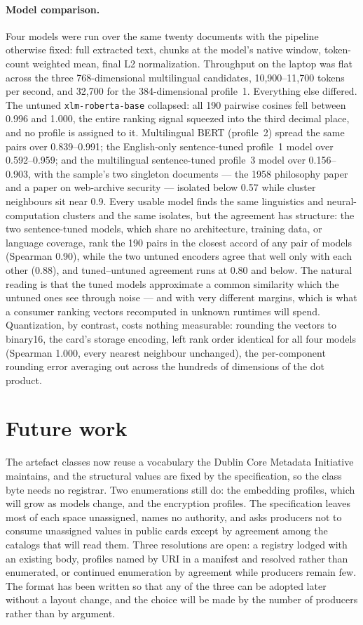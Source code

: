 \documentclass[sigconf]{acmart}
\begin{document}
\paragraph{Model comparison.} Four models were run over the same twenty
documents with the pipeline otherwise fixed: full extracted text, chunks at
the model's native window, token-count weighted mean, final L2
normalization. Throughput on the laptop was flat across the three
768-dimensional multilingual candidates, 10,900--11,700 tokens per second,
and 32,700 for the 384-dimensional profile~1. Everything else differed. The
untuned \texttt{xlm-roberta-base} collapsed: all 190 pairwise cosines fell
between 0.996 and 1.000, the entire ranking signal squeezed into the third
decimal place, and no profile is assigned to it. Multilingual BERT
(profile~2) spread the same pairs over 0.839--0.991; the English-only
sentence-tuned profile~1 model over 0.592--0.959; and the multilingual
sentence-tuned profile~3 model over 0.156--0.903, with the sample's two
singleton documents --- the 1958 philosophy paper and a paper on
web-archive security --- isolated below 0.57 while cluster neighbours sit
near 0.9. Every usable model finds the same linguistics and
neural-computation clusters and the same isolates, but the agreement has
structure: the two sentence-tuned models, which share no architecture,
training data, or language coverage, rank the 190 pairs in the closest
accord of any pair of models (Spearman 0.90), while the two untuned
encoders agree that well only with each other (0.88), and tuned--untuned
agreement runs at 0.80 and below. The natural reading is that the tuned
models approximate a common similarity which the untuned ones see through
noise --- and with very different margins, which is what a consumer ranking
vectors recomputed in unknown runtimes will spend. Quantization, by
contrast, costs nothing measurable: rounding the vectors to binary16, the
card's storage encoding, left rank order identical for all four models
(Spearman 1.000, every nearest neighbour unchanged), the per-component
rounding error averaging out across the hundreds of dimensions of the dot
product.

\section{Future work}
\label{sec:governance}

The artefact classes now reuse a vocabulary the Dublin Core Metadata
Initiative maintains, and the structural values are fixed by the
specification, so the class byte needs no registrar. Two enumerations still
do: the embedding profiles, which will grow as models change, and the
encryption profiles. The specification leaves most of each space unassigned,
names no authority, and asks producers not to consume unassigned values in
public cards except by agreement among the catalogs that will read them.
Three resolutions are open: a registry lodged with an existing body, profiles
named by URI in a manifest and resolved rather than enumerated, or continued
enumeration by agreement while producers remain few. The format has been
written so that any of the three can be adopted later without a layout
change, and the choice will be made by the number of producers rather than by
argument.
\end{document}
